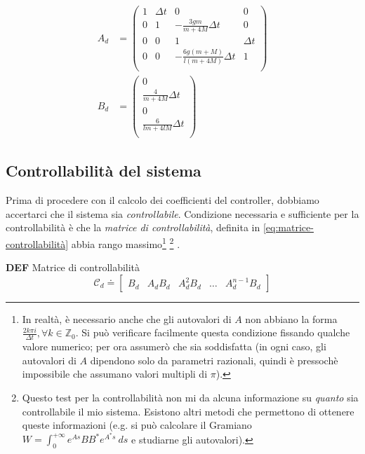 \begin{equation}
  \begin{aligned}
  A_d &=
  \left(\begin{array}{cccc}1&\Delta t&0&0\\0&1&-\frac{3gm}{m+4M}\Delta t&0\\0&0&1&\Delta t\\0&0&-\frac{6g(m+M)}{l(m+4M)} \Delta t&1\\\end{array}\right)
  \\
  B_d &=
  \left(\begin{array}{c}0\\\frac{4}{m+4M} \Delta t\\0\\\frac{6}{lm+4lM} \Delta t\\\end{array}\right)
  \label{eq:Ad-e-Bd}
  \end{aligned}
\end{equation}

\subsection{Controllabilità del sistema}\label{subsec:controllabilità}
Prima di procedere con il calcolo dei coefficienti del controller, dobbiamo accertarci che il sistema sia \emph{controllabile}.
Condizione necessaria e sufficiente per la controllabilità è che la \emph{matrice di controllabilità}, definita in \eqref{eq:matrice-controllabilità}
abbia rango massimo\footnote{
  In realtà, è necessario anche che gli autovalori di $A$ non abbiano la forma $\frac {2k\pi i} {\Delta t}, \forall k \in \mathbb Z_0$.
  Si può verificare facilmente questa condizione fissando qualche valore numerico; per
  ora assumerò che sia soddisfatta (in ogni caso, gli autovalori di $A$ dipendono solo da parametri razionali, quindi è
  pressochè impossibile che assumano valori multipli di $\pi$).
}%
\footnote{
  Questo test per la controllabilità non mi da alcuna informazione su \emph{quanto} sia controllabile il mio sistema.
  Esistono altri metodi che permettono di ottenere queste informazioni (e.g. si può calcolare il Gramiano
  $W=\int_0^{+\infty}e^{As}BB^*e^{A^*s}\ ds$ e studiarne gli autovalori).
}
\cite{sontag2013mathematical}.

\begin{framed}
  \textbf{DEF} Matrice di controllabilità
  \begin{equation}
    \mathcal C_d \doteq \left[
      \begin{matrix}
        B_d & A_dB_d & A_d^2B_d & \ldots & A_d^{n-1}B_d
      \end{matrix}
      \right]
    \label{eq:matrice-controllabilità}
  \end{equation}
\end{framed}

